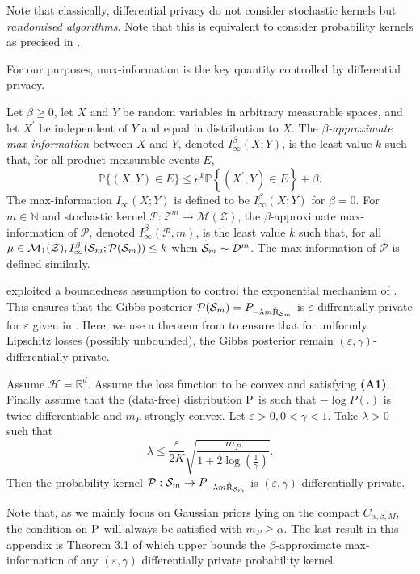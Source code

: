 \begin{noaddcontents}
\begin{remark}
Note that classically, differential privacy do not consider stochastic kernels but \emph{randomised algorithms}. Note that this is equivalent to consider probability kernels as precised in \citet[footnote 3, Appendix A]{dziugaite2018data}.
\end{remark}
For our purposes, max-information is the key quantity controlled by differential privacy.
\begin{definition}
Let $\beta \geq 0$, let $X$ and $Y$ be random variables in arbitrary measurable spaces, and let $X^{\prime}$ be independent of $Y$ and equal in distribution to $X$. The \emph{$\beta$-approximate max-information} between $X$ and $Y$, denoted $I_{\infty}^\beta(X ; Y)$, is the least value $k$ such that, for all product-measurable events $E$,
$$
\mathbb{P}\{(X, Y) \in E\} \leq e^k \mathbb{P}\left\{\left(X^{\prime}, Y\right) \in E\right\}+\beta .
$$
The max-information $I_{\infty}(X ; Y)$ is defined to be $I_{\infty}^\beta(X ; Y)$ for $\beta=0$.
For $m \in \mathbb{N}$ and stochastic kernel $\mathcal{P}: \mathcal{Z}^m \rightarrow \mathcal{M}(\mathcal{Z})$, the $\beta$-approximate max-information of $\mathcal{P}$, denoted $I_{\infty}^\beta(\mathcal{P}, m)$, is the least value $k$ such that, for all $\mu \in \mathcal{M}_1(\mathcal{Z}), I_{\infty}^\beta(\Sm ; \mathcal{P}(\Sm)) \leq k$
when $\Sm \sim \D^m$. The max-information of $\mathcal{P}$ is defined similarly.
\end{definition}
\citet{dziugaite2018data} exploited a boundedness assumption to control the exponential mechanism of \citet{mcsherry2007mechanism}. This ensures that the Gibbs posterior $\mathcal{P}(\Sm)= P_{-\lambda m \Riskhat_{\Sm}}$ is $\varepsilon$-diffrentially private for $\varepsilon$ given in \citet[Corollary 5.2]{dziugaite2018data}.
Here, we use a theorem from \citet{minami2016diff} to ensure that for uniformly Lipschitz losses (possibly unbounded), the Gibbs posterior remain $(\varepsilon, \gamma)$-differentially private.

\begin{proposition}
\label{prop: minami}
Assume $\mathcal{H}=\mathbb{R}^d$. Assume the loss function to be convex and satisfying \textbf{(A1)}. Finally assume that the (data-free) distribution $\P$ is such that $-\log P(.)$ is twice differentiable and $m_P$-strongly convex.
Let $\varepsilon>0, 0<\gamma<1$. Take $\lambda>0$ such that
\[ \lambda \leq \frac{\varepsilon}{2K}\sqrt{\frac{m_P}{1+ 2 \log\left( \frac{1}{\gamma}  \right)}}.  \]
Then the probability kernel $\mathcal{P} : \Sm \rightarrow P_{-\lambda m \Riskhat_{\Sm}}$ is $(\varepsilon,\gamma)$-differentially private.
\end{proposition}
Note that, as we mainly focus on Gaussian priors lying on the compact $C_{\alpha,\beta,M}$, the condition on $\P$ will always be satisfied with $m_P\geq \alpha$. The last result in this appendix is Theorem 3.1 of \citet{rogers2016max} which upper bounds the $\beta$-approximate max-information of any $(\varepsilon,\gamma)$ differentially private probability kernel.


\end{noaddcontents}
